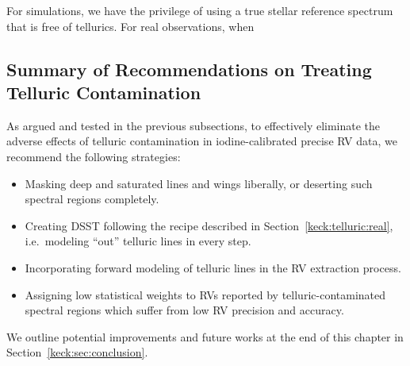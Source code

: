 For simulations, we have the privilege of using a true stellar
reference spectrum that is free of tellurics. For real observations,
when 


\subsection{Summary of Recommendations on Treating Telluric
  Contamination}\label{keck:telluric:summary} 

As argued and tested in the previous subsections, to effectively
eliminate the adverse effects of telluric contamination in
iodine-calibrated precise RV data, we recommend the following
strategies:
\begin{itemize}
  \item Masking deep and saturated lines and wings liberally, or
    deserting such spectral regions completely.
  \item Creating DSST following the recipe described in
    Section~\ref{keck:telluric:real}, i.e.\ modeling ``out'' telluric
    lines in every step. 
  \item Incorporating forward modeling of telluric lines in the RV
    extraction process.
  \item Assigning low statistical weights to RVs reported by
    telluric-contaminated spectral regions which suffer from low RV
    precision and accuracy.
\end{itemize}

We outline potential improvements and future works at the end of this
chapter in Section~\ref{keck:sec:conclusion}.